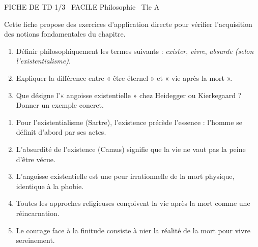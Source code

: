 \documentclass[11pt]{article}
\begin{document}
\begin{tcolorbox}[enhanced,colback=popink,colframe=popink,arc=10pt,boxrule=0pt,left=12pt,right=12pt,top=9pt,bottom=9pt]
{\color{white}\popxbold\small FICHE DE TD 1/3 \textbullet\ FACILE \hfill Philosophie \textbullet\ Tle A\par}
\end{tcolorbox}
\vspace{4pt}
Cette fiche propose des exercices d'application directe pour vérifier l'acquisition des notions fondamentales du chapitre.

\begin{exercice}
\begin{enumerate}
    \item Définir philosophiquement les termes suivants : \textit{exister}, \textit{vivre}, \textit{absurde (selon l'existentialisme)}.
    \item Expliquer la différence entre « être éternel » et « vie après la mort ».
    \item Que désigne l'« angoisse existentielle » chez Heidegger ou Kierkegaard ? Donner un exemple concret.
\end{enumerate}
\end{exercice}

\begin{exercice}
\begin{enumerate}
    \item Pour l'existentialisme (Sartre), l'existence précède l'essence : l'homme se définit d'abord par ses actes.
    \item L'absurdité de l'existence (Camus) signifie que la vie ne vaut pas la peine d'être vécue.
    \item L'angoisse existentielle est une peur irrationnelle de la mort physique, identique à la phobie.
    \item Toutes les approches religieuses conçoivent la vie après la mort comme une réincarnation.
    \item Le courage face à la finitude consiste à nier la réalité de la mort pour vivre sereinement.
\end{enumerate}
\end{exercice}
\end{document}
